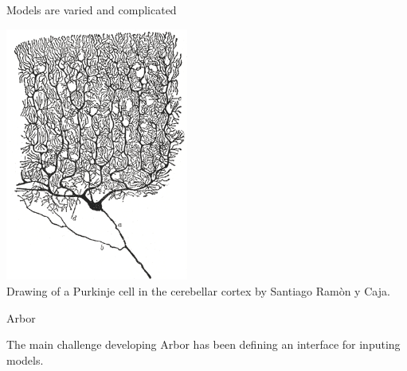 \documentclass[aspectratio=43]{beamer}
\newcommand{\arbor}{{\ttfamily Arbor}\xspace}
\begin{document}
\begin{frame}[fragile]{Models are varied and complicated}

    \begin{center}
        \includegraphics[width=0.45\textwidth]{images/purkinje_cell.png}
        \\
        {
            \scriptsize Drawing of a Purkinje cell in the cerebellar cortex by Santiago Ram\`{o}n y Caja.
        }
    \end{center}
\end{frame}

\begin{frame}[fragile]{\arbor}
%


    The main challenge developing \arbor has been defining an interface for inputing models.
\end{frame}
\end{document}
